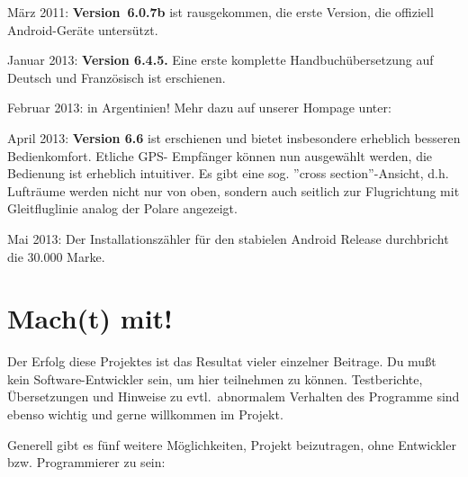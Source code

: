 März 2011: {\bf Version~6.0.7b} ist rausgekommen, die erste Version, die offiziell  Android-Geräte untersützt.

Januar 2013: {\bf Version 6.4.5.} Eine erste komplette Handbuchübersetzung auf Deutsch
und Französisch ist erschienen.

Februar 2013:  in Argentinien! Mehr dazu auf unserer Hompage unter:  

April 2013: {\bf Version 6.6} ist erschienen und bietet insbesondere erheblich besseren Bedienkomfort. Etliche GPS- Empfänger können  nun ausgewählt werden, die Bedienung ist erheblich intuitiver. 
Es gibt eine sog. ''cross section''-Ansicht, d.h. Lufträume werden nicht nur von oben, sondern auch seitlich zur Flugrichtung mit Gleitfluglinie analog der Polare angezeigt.

Mai 2013: Der Installationszähler für den stabielen Android \xc Release durchbricht 
die 30.000 Marke.


\section{Mach(t) mit!}

Der Erfolg diese Projektes ist das Resultat vieler einzelner Beitrage. Du mußt kein Software-Entwickler sein, um hier teilnehmen zu können.
Testberichte, Übersetzungen und Hinweise zu evtl.\ abnormalem Verhalten des Programme sind ebenso wichtig und gerne willkommen
im Projekt.

Generell gibt es fünf weitere Möglichkeiten, Projekt beizutragen, ohne Entwickler bzw. Programmierer zu sein:

